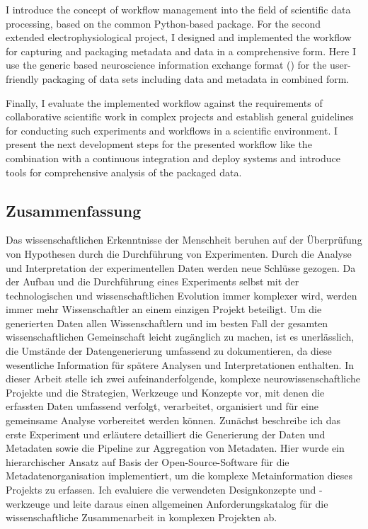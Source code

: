 I introduce the concept of workflow management into the field of scientific data processing, based on the common Python-based  package. For the second extended electrophysiological project, I designed and implemented the workflow for capturing and packaging metadata and data in a comprehensive form. Here I use the generic  based neuroscience information exchange format () for the user-friendly packaging of data sets including data and metadata in combined form.

Finally, I evaluate the implemented workflow against the requirements of collaborative scientific work in complex projects and establish general guidelines for conducting such experiments and workflows in a scientific environment. I present the next development steps for the presented workflow like the combination with a continuous integration and deploy systems and introduce tools for comprehensive analysis of the packaged data.


\clearpage
\thispagestyle{empty}
\subsection*{Zusammenfassung}
Das wissenschaftlichen Erkenntnisse der Menschheit beruhen auf der Überprüfung von Hypothesen durch die Durchführung von Experimenten. Durch die Analyse und Interpretation der experimentellen Daten werden neue Schlüsse gezogen. Da der Aufbau und die Durchführung eines Experiments selbst mit der technologischen und wissenschaftlichen Evolution immer komplexer wird, werden immer mehr Wissenschaftler an einem einzigen Projekt beteiligt. Um die generierten Daten allen Wissenschaftlern und im besten Fall der gesamten wissenschaftlichen Gemeinschaft leicht zugänglich zu machen, ist es unerlässlich, die Umstände der Datengenerierung umfassend zu dokumentieren, da diese wesentliche Information für spätere Analysen und Interpretationen enthalten.
In dieser Arbeit stelle ich zwei aufeinanderfolgende, komplexe neurowissenschaftliche Projekte und die Strategien, Werkzeuge und Konzepte vor, mit denen die erfassten Daten umfassend verfolgt, verarbeitet, organisiert und für eine gemeinsame Analyse vorbereitet werden können. Zunächst beschreibe ich das erste Experiment und erläutere detailliert die Generierung der Daten und Metadaten sowie die Pipeline zur Aggregation von Metadaten. Hier wurde ein hierarchischer Ansatz auf Basis der Open-Source-Software  für die Metadatenorganisation implementiert, um die komplexe Metainformation dieses Projekts zu erfassen. Ich evaluiere die verwendeten Designkonzepte und -werkzeuge und leite daraus einen allgemeinen Anforderungskatalog für die wissenschaftliche Zusammenarbeit in komplexen Projekten ab.

